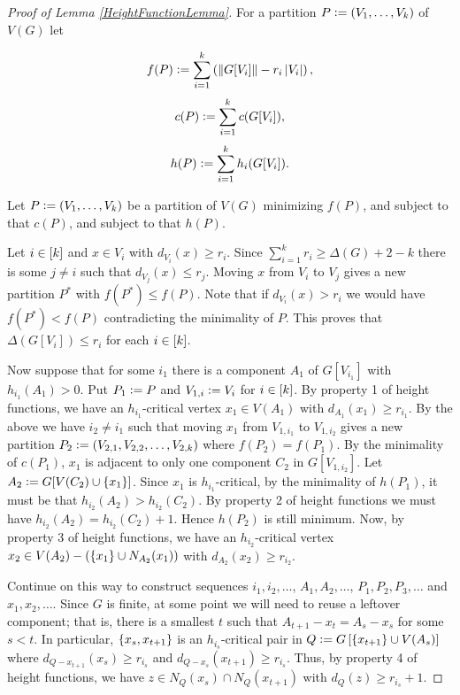 \begin{proof}[Proof of Lemma \ref{HeightFunctionLemma}]
For a partition $P \mathrel{\mathop:}= \left( V_1, \ldots, V_k \right)$ of $V(G)$ let

\[f(P) \mathrel{\mathop:}= \sum_{i=1}^k \left( \left\Vert G[V_i]\right\Vert - r_i\left|V_i\right| \right),\]
\[c(P) \mathrel{\mathop:}= \sum_{i=1}^k c(G[V_i]),\]
\[h(P) \mathrel{\mathop:}= \sum_{i=1}^k h_i(G[V_i]).\]

\noindent Let $P \mathrel{\mathop:}= \left( V_1, \ldots, V_k \right)$ be a partition of $V(G)$ minimizing $f(P)$, and subject to that $c(P)$, and subject to that $h(P)$.

Let $i \in \left[k\right]$ and $x \in V_i$ with $d_{V_i}(x) \geq r_i$.  Since $\sum_{i=1}^k r_i \geq \Delta(G) + 2 - k$ there is some $j \neq i$ such that $d_{V_j}(x) \leq r_j$.  Moving $x$ from $V_i$ to $V_j$ gives a new partition $P^*$ with $f(P^*) \leq f(P)$.  Note that if $d_{V_i}(x) > r_i$ we would have $f(P^*) < f(P)$ contradicting the minimality of $P$. This proves that $\Delta(G[V_i]) \leq r_i$ for each $i \in \left[k\right]$.

Now suppose that for some $i_1$ there is a component $A_1$ of $G[V_{i_1}]$ with
$h_{i_1}(A_1) > 0$. Put $P_1 \mathrel{\mathop:}= P$ and $V_{1,i} \mathrel{\mathop:}= V_i$ for $i \in \left[k\right]$. By property 1 of height functions, we have an $h_{i_1}$-critical vertex $x_1 \in V(A_1)$ with $d_{A_1}(x_1) \geq r_{i_1}$.  By the above we have $i_2 \neq i_1$ such that moving $x_1$ from $V_{1, i_1}$ to $V_{1, i_2}$ gives a new partition $P_2 \mathrel{\mathop:}= \left( V_{2, 1}, V_{2,2}, \ldots, V_{2,k} \right)$ where $f(P_2) = f(P_1)$.  By the minimality of $c(P_1)$, $x_1$ is adjacent to only one component $C_2$ in $G[V_{1, i_2}]$. Let $A_2 \mathrel{\mathop:}= G[V(C_2) \cup \left\{ x_1 \right\}]$.  Since $x_1$ is $h_{i_1}$-critical, by the minimality of $h(P_1)$, it must be that $h_{i_2}(A_2) > h_{i_2}(C_2)$.  By property 2 of height functions we must have $h_{i_2}(A_2) = h_{i_2}(C_2) + 1$.  Hence $h(P_2)$ is still minimum.  Now, by property 3 of height functions, we have an $h_{i_2}$-critical vertex $x_2 \in V(A_2) - \left( \left\{ x_1 \right\} \cup N_{A_2}(x_1) \right)$ with $d_{A_2}(x_2) \geq r_{i_2}$.

Continue on this way to construct sequences $i_1, i_2, \ldots$, $A_1, A_2, \ldots$, $P_1, P_2, P_3, \ldots$ and $x_1, x_2, \ldots$.  Since $G$ is finite, at some point we will need to reuse a leftover component; that is, there is a smallest $t$ such that $A_{t + 1} - x_t = A_s - x_s$ for some $s < t$.  In particular, $\left\{ x_s, x_{t+1} \right\}$ is an $h_{i_s}$-critical pair in  $Q \mathrel{\mathop:}= G\left[\left\{ x_{t+1} \right\} \cup V(A_s)\right]$ where $d_{Q-x_{t+1}}(x_s) \geq r_{i_s}$ and $d_{Q-x_s}(x_{t+1}) \geq r_{i_s}$.  Thus, by property 4 of height functions, we have $z \in N_Q(x_s) \cap N_Q(x_{t+1})$ with $d_Q(z) \geq r_{i_s} + 1$.


\end{proof}
